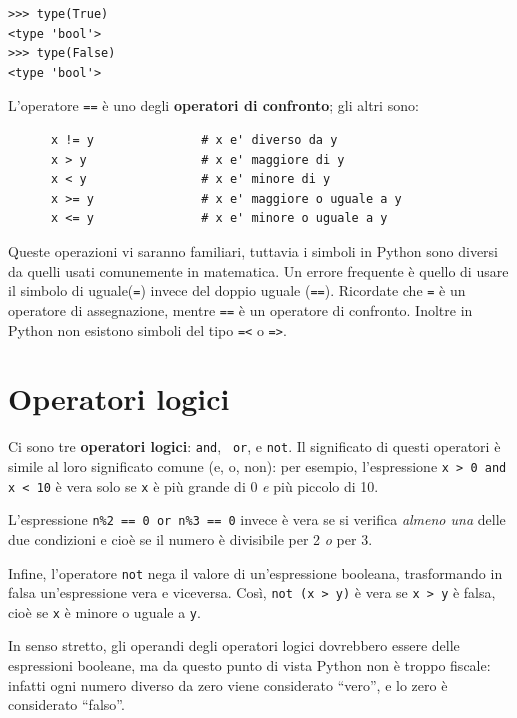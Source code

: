 \documentclass[10pt]{book}
\begin{document}
\begin{verbatim}
>>> type(True)
<type 'bool'>
>>> type(False)
<type 'bool'>
\end{verbatim}
%
L'operatore {\tt ==} è uno degli {\bf operatori di confronto}; gli altri sono:

\begin{verbatim}
      x != y               # x e' diverso da y
      x > y                # x e' maggiore di y
      x < y                # x e' minore di y
      x >= y               # x e' maggiore o uguale a y
      x <= y               # x e' minore o uguale a y
\end{verbatim}
%
Queste operazioni vi saranno familiari, tuttavia i simboli in Python sono diversi da quelli usati comunemente in matematica. Un errore frequente è quello di usare il simbolo di uguale({\tt =}) invece del doppio uguale
({\tt ==}). Ricordate che {\tt =} è un operatore di assegnazione, mentre
{\tt ==} è un operatore di confronto. Inoltre in Python non esistono simboli del
tipo {\tt =<} o {\tt =>}.


\section {Operatori logici}

Ci sono tre {\bf operatori logici}: {\tt and}, {\tt
or}, e {\tt not}.  Il significato di questi operatori è simile al loro significato comune (e, o, non): per esempio, l'espressione {\tt x > 0 and x < 10} è vera solo se {\tt x} è più grande di 0 {\em e} più piccolo di 10.

L'espressione {\tt n\%2 == 0 or n\%3 == 0} invece è vera se si verifica {\em almeno una} delle due condizioni e cioè se il numero è divisibile per 2 {\em o} per 3.

Infine, l'operatore {\tt not} nega il valore di un'espressione booleana,
   trasformando in falsa un'espressione vera e viceversa. Così, {\tt not (x > y)} è vera se {\tt x > y} è falsa, cioè se {\tt x} è minore o uguale a {\tt y}.

In senso stretto, gli operandi degli operatori logici dovrebbero essere delle espressioni booleane, ma da questo punto di vista Python non è troppo fiscale: infatti ogni numero diverso da zero viene considerato ``vero'', e lo zero è considerato ``falso''.
\end{document}
